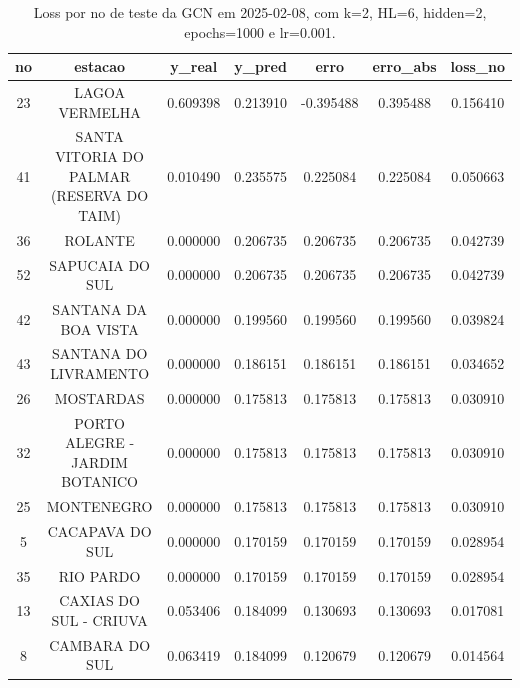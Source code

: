 \begin{table}[h]
\centering
\caption{Loss por no de teste da GCN em 2025-02-08, com k=2, HL=6, hidden=2, epochs=1000 e lr=0.001.}
\label{tab:gcn_loss_k2_hl6_h2_e1000_d20250208}
\begin{tabular}{ccccccc}
\toprule
no & estacao & y\_real & y\_pred & erro & erro\_abs & loss\_no \\
\midrule
23 & LAGOA VERMELHA & 0.609398 & 0.213910 & -0.395488 & 0.395488 & 0.156410 \\
41 & SANTA VITORIA DO PALMAR (RESERVA DO TAIM) & 0.010490 & 0.235575 & 0.225084 & 0.225084 & 0.050663 \\
36 & ROLANTE & 0.000000 & 0.206735 & 0.206735 & 0.206735 & 0.042739 \\
52 & SAPUCAIA DO SUL & 0.000000 & 0.206735 & 0.206735 & 0.206735 & 0.042739 \\
42 & SANTANA DA BOA VISTA & 0.000000 & 0.199560 & 0.199560 & 0.199560 & 0.039824 \\
43 & SANTANA DO LIVRAMENTO & 0.000000 & 0.186151 & 0.186151 & 0.186151 & 0.034652 \\
26 & MOSTARDAS & 0.000000 & 0.175813 & 0.175813 & 0.175813 & 0.030910 \\
32 & PORTO ALEGRE - JARDIM BOTANICO & 0.000000 & 0.175813 & 0.175813 & 0.175813 & 0.030910 \\
25 & MONTENEGRO & 0.000000 & 0.175813 & 0.175813 & 0.175813 & 0.030910 \\
5 & CACAPAVA DO SUL & 0.000000 & 0.170159 & 0.170159 & 0.170159 & 0.028954 \\
35 & RIO PARDO & 0.000000 & 0.170159 & 0.170159 & 0.170159 & 0.028954 \\
13 & CAXIAS DO SUL - CRIUVA & 0.053406 & 0.184099 & 0.130693 & 0.130693 & 0.017081 \\
8 & CAMBARA DO SUL & 0.063419 & 0.184099 & 0.120679 & 0.120679 & 0.014564 \\
\bottomrule
\end{tabular}
\end{table}
